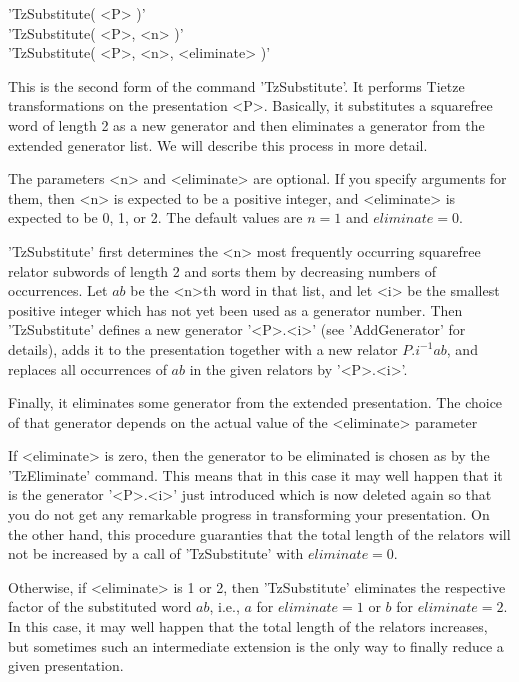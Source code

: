 \vspace{5mm}
'TzSubstitute( <P> )'%
 \\
'TzSubstitute( <P>, <n> )' \\
'TzSubstitute( <P>, <n>, <eliminate> )'

This is the second form of the command 'TzSubstitute'.
It performs Tietze transformations on the presentation <P>.
Basically, it  substitutes  a  squarefree  word  of  length  2  as  a new
generator and then eliminates a  generator  from  the extended  generator
list. We will describe this process in more detail.

The  parameters  <n>  and  <eliminate>  are  optional.   If  you  specify
arguments  for them, then <n>  is expected to be a  positive integer, and
<eliminate> is expected to be 0, 1, or 2.  The default values are $n = 1$
and $eliminate = 0$.

'TzSubstitute'   first  determines  the  <n>  most  frequently  occurring
squarefree  relator subwords  of  length  2 and sorts  them by decreasing
numbers of occurrences.  Let $ab$ be the <n>th word in that list, and let
<i> be the smallest  positive integer  which has not  yet  been used as a
generator number.  Then 'TzSubstitute' defines a new  generator '<P>.<i>'
(see  'AddGenerator' for  details), adds it to  the presentation together
with a new relator $P.i^{-1}ab$, and  replaces all occurrences of $ab$ in
the given relators by '<P>.<i>'.

Finally,  it eliminates some generator  from  the  extended presentation.
The  choice  of that  generator  depends  on  the  actual  value  of  the
<eliminate> parameter\:

If <eliminate> is zero, then the generator to be eliminated is  chosen as
by the  'TzEliminate' command.  This means  that in this case it may well
happen that  it is the generator '<P>.<i>' just introduced which  is  now
deleted  again  so  that  you do  not  get  any  remarkable  progress  in
transforming  your  presentation.   On  the other  hand,  this  procedure
guaranties that the total length of the relators will not be increased by
a call of 'TzSubstitute' with $eliminate = 0$.

Otherwise,  if <eliminate> is 1 or 2, then  'TzSubstitute' eliminates the
respective factor of the  substituted word $ab$, i.e., $a$ for $eliminate
=  1$ or  $b$ for $eliminate = 2$.  In this case, it may well happen that
the  total  length  of  the  relators  increases,  but  sometimes such an
intermediate  extension  is  the  only  way to  finally  reduce  a  given
presentation.

